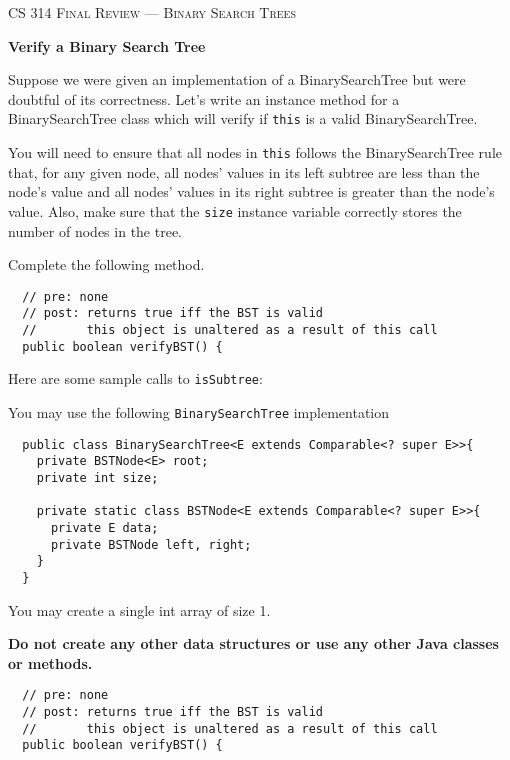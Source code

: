 \documentclass[12pt,letter]{article}
\begin{document}
\noindent\textsc{\large CS 314 Final Review --- Binary Search Trees}

\vspace{6pt}
\noindent\textbf{Verify a Binary Search Tree}

\vspace{2pt}
\noindent Suppose we were given an implementation of a BinarySearchTree but were doubtful of its correctness.
Let's write an instance method for a BinarySearchTree class which will verify if \texttt{this} is a valid BinarySearchTree.

\vspace{4pt}

\noindent You will need to ensure that all nodes in \texttt{this} follows the BinarySearchTree rule that, for any given node, all nodes' values in its 
left subtree are less than the node's value and all nodes' values in its right subtree is greater than the node's value. Also, make sure
that the \texttt{size} instance variable correctly stores the number of nodes in the tree.

\vspace{4pt}
\noindent Complete the following method.
\begin{verbatim}
  // pre: none
  // post: returns true iff the BST is valid
  //       this object is unaltered as a result of this call
  public boolean verifyBST() {
\end{verbatim}

\vspace{4pt}

\noindent Here are some sample calls to \texttt{isSubtree}: \newline

\vspace{4pt}
\noindent You may use the following \texttt{BinarySearchTree} implementation

\begin{verbatim}
  public class BinarySearchTree<E extends Comparable<? super E>>{
    private BSTNode<E> root;
    private int size;

    private static class BSTNode<E extends Comparable<? super E>>{
      private E data;
      private BSTNode left, right;
    }
  }
\end{verbatim}

\noindent You may create a single int array of size 1.

\noindent \textbf{Do not create any other data structures or use any other Java classes or methods.}

\clearpage
\begin{verbatim}
  // pre: none
  // post: returns true iff the BST is valid
  //       this object is unaltered as a result of this call
  public boolean verifyBST() {
\end{verbatim}
\end{document}
